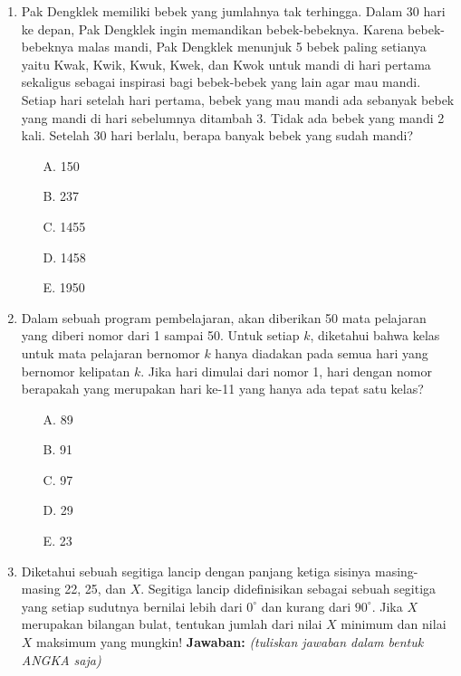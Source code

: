 \documentclass[a4paper,11pt]{article}
\begin{document}
\begin{enumerate}
    \item Pak Dengklek memiliki bebek yang jumlahnya tak terhingga. Dalam 30 hari ke depan, 
    Pak Dengklek ingin memandikan bebek-bebeknya. Karena bebek-bebeknya malas mandi, 
    Pak Dengklek menunjuk 5 bebek paling setianya yaitu Kwak, Kwik, Kwuk, Kwek, dan Kwok 
    untuk mandi di hari pertama sekaligus sebagai inspirasi bagi bebek-bebek yang lain agar mau mandi. 
    Setiap hari setelah hari pertama, bebek yang mau mandi ada sebanyak bebek yang mandi di hari sebelumnya ditambah 3. 
    Tidak ada bebek yang mandi 2 kali. Setelah 30 hari berlalu, berapa banyak bebek yang sudah mandi?

    \begin{multicols}{5}
      \begin{itemize}
        \item[A.] 150
        \item[B.] 237
        \item[C.] 1455
        \item[D.] 1458
        \item[E.] 1950
    \end{itemize}
    \end{multicols}

    \item Dalam sebuah program pembelajaran, akan diberikan 50 mata pelajaran yang diberi nomor dari 1 sampai 50. 
    Untuk setiap $k$, diketahui bahwa kelas untuk mata pelajaran bernomor $k$ hanya diadakan pada semua hari yang bernomor kelipatan $k$. 
    Jika hari dimulai dari nomor 1, hari dengan nomor berapakah yang merupakan hari ke-11 yang hanya ada tepat satu kelas?

    \begin{multicols}{5}
    \begin{itemize}
        \item[A.] 89
        \item[B.] 91
        \item[C.] 97
        \item[D.] 29
        \item[E.] 23
    \end{itemize}
    \end{multicols}

    \item Diketahui sebuah segitiga lancip dengan panjang ketiga sisinya masing-masing 22, 25, dan $X$. Segitiga lancip didefinisikan sebagai sebuah segitiga yang setiap sudutnya bernilai lebih dari $0^\circ$ dan kurang dari $90^\circ$. Jika $X$ merupakan bilangan bulat, tentukan jumlah dari nilai $X$ minimum dan nilai $X$ maksimum yang mungkin!
      \textbf{Jawaban:} \underline{\hspace{3cm}} \textit{(tuliskan jawaban dalam bentuk ANGKA saja)}


\end{enumerate}
\end{document}
